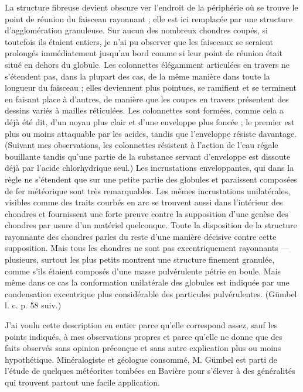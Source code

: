 \documentclass[a4paper, 12pt, oneside, french]{article}
\begin{document}
La structure fibreuse devient obscure ver l'endroit de la périphérie où se trouve le point de réunion du faisceau rayonnant ; elle est ici remplacée par une structure d'agglomération granuleuse. Sur aucun des nombreux chondres coupés, si toutefois ils étaient entiers, je n'ai pu observer que les faisceaux se seraient prolongés immédiatement jusqu'au bord comme si leur point de réunion était situé en dehors du globule. Les colonnettes élégamment articulées en travers ne s'étendent pas, dans la plupart des cas, de la même manière dans toute la longueur du faisceau ; elles deviennent plus pointues, se ramifient et se terminent en faisant place à d'autres, de manière que les coupes en travers présentent des dessins variés à mailles réticulées. Les colonnettes sont formées, comme cela a déjà été dit, d'un noyau plus clair et d'une enveloppe plus foncée ; le premier est plus ou moins attaquable par les acides, tandis que l'enveloppe résiste davantage. \fg (Suivant mes observations, les colonnettes résistent à l'action de l'eau régale bouillante tandis qu'une partie de la substance servant d'enveloppe est dissoute déjà par l'acide chlorhydrique seul.) \og Les incrustations enveloppantes, qui dans la règle ne s'étendent que sur une petite partie des globules et paraissent composées de fer météorique sont très remarquables. Les mêmes incrustations unilatérales, visibles comme des traits courbés en arc se trouvent aussi dans l'intérieur des chondres et fournissent une forte preuve contre la supposition d'une genèse des chondres par usure d'un matériel quelconque. Toute la disposition de la structure rayonnante des chondres parles du reste d'une manière décisive contre cette supposition. Mais tous les chondres ne sont pas excentriquement rayonnants --- plusieurs, surtout les plus petits montrent une structure finement granulée, comme s'ils étaient composés d'une masse pulvérulente pétrie en boule. Mais même dans ce cas la conformation unilatérale des globules est indiquée par une condensation excentrique plus considérable des particules pulvérulentes. \fg (Gümbel l. c. p. 58 suiv.)

J'ai voulu cette description en entier parce qu'elle correspond assez, sauf les points indiqués, à mes observations propres et parce qu'elle ne donne que des faits observés sans opinion préconçue et sans autre explication plus ou moins hypothétique. Minéralogiste et géologue consommé, M. Gümbel est parti de l'étude de quelques météorites tombées en Bavière pour s'élever à des généralités qui trouvent partout une facile application.
\end{document}
